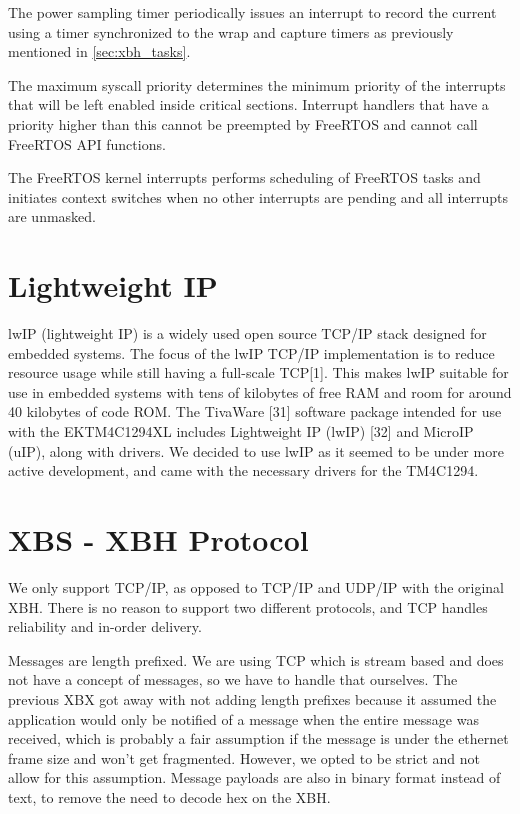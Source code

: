 \documentclass[twoside,11pt]{cergdoc}
\begin{document}
The power sampling timer periodically issues an interrupt to record the current using a timer
synchronized to the wrap and capture timers as previously mentioned in
\ref{sec:xbh_tasks}.

The maximum syscall priority determines the minimum priority of the interrupts
that will be left enabled inside critical sections. Interrupt handlers that have
a priority higher than this cannot be preempted by FreeRTOS and cannot call
FreeRTOS API functions. 

The FreeRTOS kernel interrupts performs scheduling of FreeRTOS tasks and
initiates context switches when no other interrupts are pending and all
interrupts are unmasked. 


  \section{Lightweight IP}

lwIP (lightweight IP) is a widely
used open source TCP/IP stack designed
for embedded systems. The focus of the
lwIP TCP/IP implementation is to reduce
resource usage while still having a full-scale
TCP[1]. This makes lwIP suitable for use in
embedded systems with tens of kilobytes of
free RAM and room for around 40 kilobytes
of code ROM. The TivaWare [31] software
package intended for use with the EKTM4C1294XL
includes Lightweight IP
(lwIP) [32] and MicroIP (uIP), along with
drivers. 
 We decided to use lwIP as it
seemed to be under more active development, and came with the necessary drivers
for the TM4C1294.


  \section{XBS - XBH Protocol}
We only support TCP/IP, as opposed to TCP/IP and UDP/IP with the
        original XBH. There is no reason to support two different protocols, and
        TCP handles reliability and in-order delivery.

Messages are length prefixed. We are using TCP which is stream based
        and does not have a concept of messages, so we have to handle that
        ourselves. The previous XBX got away with not adding length prefixes
        because it assumed the application would only be notified of a message
        when the entire message was received, which is probably a fair
        assumption if the message is under the ethernet frame size and won't get
        fragmented. However, we opted to be strict and not allow for this
        assumption. Message payloads are also in binary format instead of text,
        to remove the need to decode hex on the XBH. 
\end{document}
